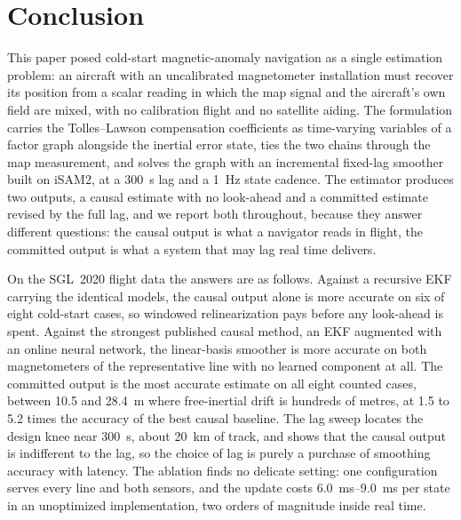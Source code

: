 
\section{Conclusion}\label{sec:conclusion}
This paper posed cold-start magnetic-anomaly navigation as a single estimation
problem: an aircraft with an uncalibrated magnetometer installation must
recover its position from a scalar reading in which the map signal and the
aircraft's own field are mixed, with no calibration flight and no satellite
aiding. The formulation carries the Tolles--Lawson compensation coefficients as
time-varying variables of a factor graph alongside the inertial error state,
ties the two chains through the map measurement, and solves the graph with an
incremental fixed-lag smoother built on iSAM2, at a \SI{300}{\second} lag and a
\SI{1}{\hertz} state cadence. The estimator produces two outputs, a causal
estimate with no look-ahead and a committed estimate revised by the full lag,
and we report both throughout, because they answer different questions: the
causal output is what a navigator reads in flight, the committed output is what
a system that may lag real time delivers.

On the SGL~2020 flight data the answers are as follows. Against a recursive EKF
carrying the identical models, the causal output alone is more accurate on six
of eight cold-start cases, so windowed relinearization pays before any
look-ahead is spent. Against the strongest published causal method, an EKF
augmented with an online neural network, the linear-basis smoother is more
accurate on both magnetometers of the representative line with no learned
component at all. The committed output is the most accurate estimate on all
eight counted cases, between \SI{10.5}{} and \SI{28.4}{\meter} where
free-inertial drift is hundreds of metres, at \num{1.5} to \num{5.2} times the
accuracy of the best causal baseline. The lag sweep locates the design knee
near \SI{300}{\second}, about \SI{20}{\kilo\meter} of track, and shows that the
causal output is indifferent to the lag, so the choice of lag is purely a
purchase of smoothing accuracy with latency. The ablation finds no delicate
setting: one configuration serves every line and both sensors, and the update
costs \SIrange{6.0}{9.0}{\milli\second} per state in an unoptimized
implementation, two orders of magnitude inside real time.

